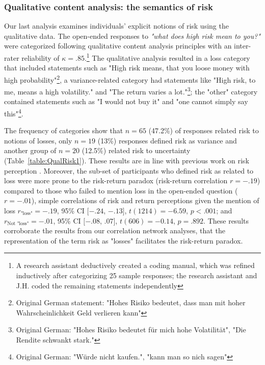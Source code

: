 \documentclass[a4paper,man, natbib,floatsintext]{apa6} %
\begin{document}
\subsubsection{Qualitative content analysis: the semantics of risk}
Our last analysis examines individuals' explicit notions of risk using the qualitative data. The open-ended responses to \textit{"what does high risk mean to you?"} were categorized following qualitative content analysis principles \citep{Mayring2014} with an inter-rater reliability of $\kappa = .85$.\footnote{A research assistant deductively created a coding manual, which was refined inductively after categorizing 25 sample responses; the research assistant and J.H. coded the remaining statements independently} The qualitative analysis resulted in a loss category that included statements such as "High risk means, that you loose money with high probability"\footnote{Original German statement: "Hohes Risiko bedeutet, dass man mit hoher Wahrscheinlichkeit Geld verlieren kann"}, a variance-related category had statements like "High risk, to me, means a high volatility." and "The return varies a lot."\footnote{Original German: "Hohes Risiko bedeutet für mich hohe Volatilität", "Die Rendite schwankt stark."}; the "other" category contained statements such as "I would not buy it" and "one cannot simply say this"\footnote{Original German: "Würde nicht kaufen.", "kann man so nich sagen"}.

The frequency of categories show that $n=65$ (47.2\%) of responses related risk to notions of losses, only $n=
19$ (13\%) responses defined risk as variance and another group of $n=20$ (12.5\%) related risk to uncertainty (Table~\ref{table:QualRisk1}). These results are in line with previous work on risk perception \citep[e.g.,][]{Mohr2010, Duxbury2004}. Moreover, the sub-set of participants who defined risk as related to loss were more prone to the risk-return paradox (risk-return correlation $r=-.19$) compared to those who failed to mention loss in the open-ended question ($r=-.01$), simple correlations of risk and return perceptions given the mention of loss $r_{\text{"loss"}} = -.19$, 95\% CI $[-.24$, $-.13]$, $t(1214) = -6.59$, $p < .001$; and $r_{\text{Not "loss"}} = -.01$, 95\% CI $[-.08$, $.07]$, $t(606) = -0.14$, $p = .892$. These results corroborate the results from our correlation network analyses, that the representation of the term risk as "losses" facilitates the risk-return paradox.

\end{document}
